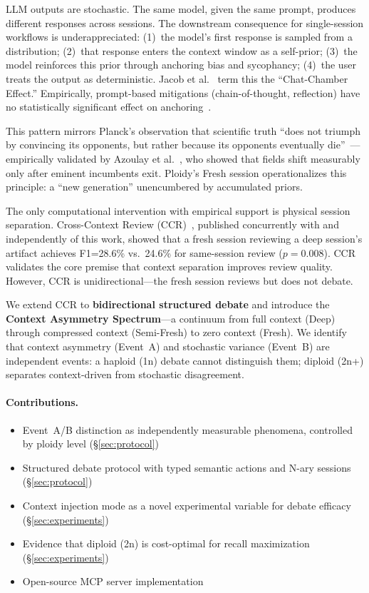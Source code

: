 \documentclass{article}
\begin{document}
LLM outputs are stochastic. The same model, given the same prompt, produces different responses across sessions. The downstream consequence for single-session workflows is underappreciated: (1)~the model's first response is sampled from a distribution; (2)~that response enters the context window as a self-prior; (3)~the model reinforces this prior through anchoring bias and sycophancy; (4)~the user treats the output as deterministic. Jacob et al.~\citep{jacob2025chatchamber} term this the ``Chat-Chamber Effect.'' Empirically, prompt-based mitigations (chain-of-thought, reflection) have no statistically significant effect on anchoring~\citep{feng2026anchoring}.

This pattern mirrors Planck's observation that scientific truth ``does not triumph by convincing its opponents, but rather because its opponents eventually die''~\citep{planck1950}---empirically validated by Azoulay et al.~\citep{azoulay2019}, who showed that fields shift measurably only after eminent incumbents exit. Ploidy's Fresh session operationalizes this principle: a ``new generation'' unencumbered by accumulated priors.

The only computational intervention with empirical support is physical session separation. Cross-Context Review (CCR)~\citep{song2026ccr}, published concurrently with and independently of this work, showed that a fresh session reviewing a deep session's artifact achieves F1=28.6\% vs.\ 24.6\% for same-session review ($p=0.008$). CCR validates the core premise that context separation improves review quality. However, CCR is unidirectional---the fresh session reviews but does not debate.

We extend CCR to \textbf{bidirectional structured debate} and introduce the \textbf{Context Asymmetry Spectrum}---a continuum from full context (Deep) through compressed context (Semi-Fresh) to zero context (Fresh). We identify that context asymmetry (Event~A) and stochastic variance (Event~B) are independent events: a haploid (1n) debate cannot distinguish them; diploid (2n+) separates context-driven from stochastic disagreement.

\paragraph{Contributions.}
\begin{itemize}[leftmargin=1.5em, itemsep=1pt]
  \item Event~A/B distinction as independently measurable phenomena, controlled by ploidy level (\S\ref{sec:protocol})
  \item Structured debate protocol with typed semantic actions and N-ary sessions (\S\ref{sec:protocol})
  \item Context injection mode as a novel experimental variable for debate efficacy (\S\ref{sec:experiments})
  \item Evidence that diploid (2n) is cost-optimal for recall maximization (\S\ref{sec:experiments})
  \item Open-source MCP server implementation
\end{itemize}
\end{document}
